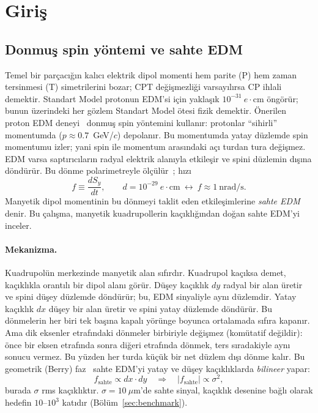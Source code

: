 \documentclass[11pt,a4paper]{article}
\begin{document}
\section{Giriş}
\subsection{Donmuş spin yöntemi ve sahte EDM}
Temel bir parçacığın kalıcı elektrik dipol momenti hem parite (P) hem zaman tersinmesi (T) simetrilerini
bozar; CPT değişmezliği varsayılırsa CP ihlali demektir. Standart Model protonun EDM'si için yaklaşık
$10^{-31}~e\cdot$cm öngörür; bunun üzerindeki her gözlem Standart Model ötesi fizik demektir. Önerilen proton
EDM deneyi~\cite{srEDM,omarov} donmuş spin yöntemini kullanır: protonlar ``sihirli'' momentumda
($p\approx0.7$~GeV/$c$) depolanır. Bu momentumda yatay düzlemde spin momentumu izler; yani spin ile
momentum arasındaki açı turdan tura değişmez. EDM varsa saptırıcıların radyal elektrik alanıyla etkileşir
ve spini düzlemin dışına döndürür. Bu dönme polarimetreyle ölçülür~\cite{polarimeter}; hızı
\begin{equation}
f \equiv \frac{dS_y}{dt},\qquad d=10^{-29}~e\cdot\text{cm}\ \longleftrightarrow\ f\approx1~\text{nrad/s}.
\end{equation}
Manyetik dipol momentinin bu dönmeyi taklit eden etkileşimlerine \emph{sahte EDM} denir. Bu çalışma,
manyetik kuadrupollerin kaçıklığından doğan sahte EDM'yi inceler.

\paragraph{Mekanizma.} Kuadrupolün merkezinde manyetik alan sıfırdır. Kuadrupol kaçıksa demet,
kaçıklıkla orantılı bir dipol alanı görür. Düşey kaçıklık $dy$ radyal bir alan üretir ve spini düşey
düzlemde döndürür; bu, EDM sinyaliyle aynı düzlemdir. Yatay kaçıklık $dx$ düşey bir alan üretir ve spini
yatay düzlemde döndürür. Bu dönmelerin her biri tek başına kapalı yörünge boyunca ortalamada sıfıra
kapanır. Ama dik eksenler etrafındaki dönmeler birbiriyle değişmez (komütatif değildir): önce bir eksen
etrafında sonra diğeri etrafında dönmek, ters sıradakiyle aynı sonucu vermez. Bu yüzden her turda küçük bir
net düzlem dışı dönme kalır. Bu geometrik (Berry) faz~\cite{berry1984,aharonov1987,farley2004,haciomeroglu2019}
sahte EDM'yi yatay ve düşey kaçıklıklarda \emph{bilineer} yapar:
\begin{equation}
f_\text{sahte}\propto dx\cdot dy\quad\Rightarrow\quad|f_\text{sahte}|\propto\sigma^2,
\label{eq:sigma2}
\end{equation}
burada $\sigma$ rms kaçıklıktır. $\sigma=10~\mu$m'de sahte sinyal, kaçıklık desenine bağlı olarak hedefin
$10$--$10^3$ katıdır (Bölüm~\ref{sec:benchmark}).
\end{document}
